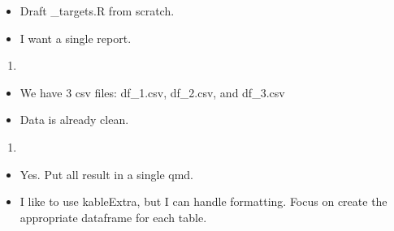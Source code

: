 \documentclass[
  letterpaper,
]{article}
\providecommand{\tightlist}{%
  \setlength{\itemsep}{0pt}\setlength{\parskip}{0pt}}\usepackage{longtable,booktabs,array}
\begin{document}
\begin{itemize}
\tightlist
\item
  Draft \_targets.R from scratch.
\item
  I want a single report.
\end{itemize}

\begin{enumerate}
\def\labelenumi{\arabic{enumi}.}
\setcounter{enumi}{4}
\tightlist
\item
\end{enumerate}

\begin{itemize}
\tightlist
\item
  We have 3 csv files: df\_1.csv, df\_2.csv, and df\_3.csv
\item
  Data is already clean.
\end{itemize}

\begin{enumerate}
\def\labelenumi{\arabic{enumi}.}
\setcounter{enumi}{5}
\tightlist
\item
\end{enumerate}

\begin{itemize}
\tightlist
\item
  Yes. Put all result in a single qmd.
\item
  I like to use kableExtra, but I can handle formatting. Focus on create
  the appropriate dataframe for each table.
\end{itemize}
\end{document}
